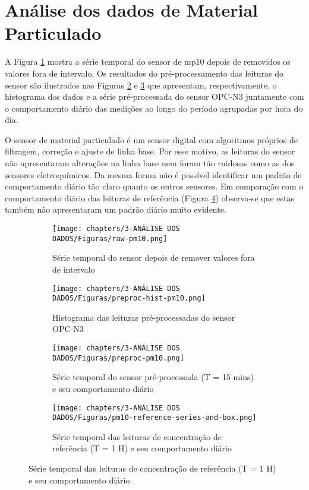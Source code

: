 \section{Análise dos dados de Material Particulado}

A Figura \ref{fig:data-pm10-raw} mostra a série temporal do sensor de \acrshort{mp10} depois de removidos os valores fora de intervalo. Os resultados do pré-processamento das leituras do sensor são ilustrados nas Figuras \ref{fig:data-pm10-preproc-hist} e \ref{fig:data-pm10-preproc-15} que apresentam, respectivamente, o histograma dos dados e a série pré-processada do sensor OPC-N3 juntamente com o comportamento diário das medições ao longo do período agrupadas por hora do dia.

O sensor de material particulado é um sensor digital com algoritmos próprios de filtragem, correção e ajuste de linha base. Por esse motivo, as leituras do sensor não apresentaram alterações na linha base nem foram tão ruidosas como as dos sensores eletroquímicos. Da mesma forma não é possível identificar um padrão de comportamento diário tão claro quanto os outros sensores. Em comparação com o comportamento diário das leituras de referência (Figura \ref{fig:data-pm10-reference}) observa-se que estas também não apresentaram um padrão diário muito evidente.

\begin{figure}[h!]
    \centering
    \caption{Série temporal das leituras do sensor OPC-N3}
    \begin{subfigure}{0.495\textwidth}
        \texttt{[image: chapters/3-ANÁLISE DOS DADOS/Figuras/raw-pm10.png]}
        \caption{Série temporal do sensor depois de remover valores fora de intervalo}
        \label{fig:data-pm10-raw}
    \end{subfigure}
    \hfill
    \begin{subfigure}{0.495\textwidth}
        \texttt{[image: chapters/3-ANÁLISE DOS DADOS/Figuras/preproc-hist-pm10.png]}
        \caption{Histograma das leituras pré-processadas do sensor OPC-N3}
        \label{fig:data-pm10-preproc-hist}
    \end{subfigure}
    \hfill
    \begin{subfigure}{0.99\textwidth}
        \texttt{[image: chapters/3-ANÁLISE DOS DADOS/Figuras/preproc-pm10.png]}
        \caption{Série temporal do sensor pré-processada (T = 15 mins) e seu comportamento diário}
        \label{fig:data-pm10-preproc-15}
    \end{subfigure}
    \hfill
    \begin{subfigure}{0.99\textwidth}
        \texttt{[image: chapters/3-ANÁLISE DOS DADOS/Figuras/pm10-reference-series-and-box.png]}
        \caption{Série temporal das leituras de concentração de referência (T = 1 H) e seu comportamento diário}
        \label{fig:data-pm10-reference}
    \end{subfigure}
    \hfill
    \label{fig:data-pm10}
\end{figure}


